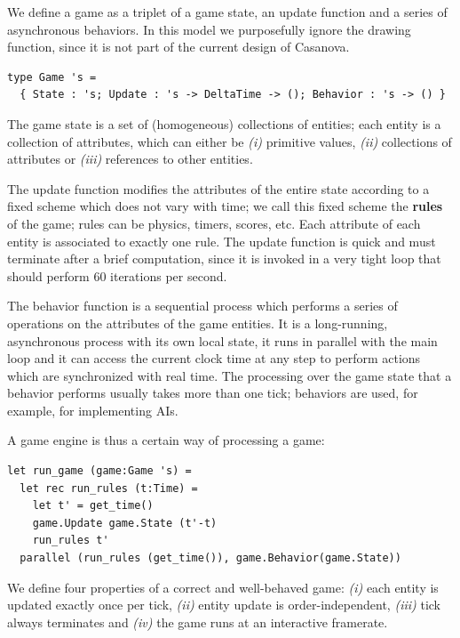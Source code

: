 
We define a game as a triplet of a game state, an update function and a series of asynchronous behaviors. In this model we purposefully ignore the drawing function, since it is not part of the current design of Casanova.

\begin{lstlisting}
type Game 's =  
  { State : 's; Update : 's -> DeltaTime -> (); Behavior : 's -> () }
\end{lstlisting}

The game state is a set of (homogeneous) collections of entities; each entity is a collection of attributes, which can either be \textit{(i)} primitive values, \textit{(ii)} collections of attributes or \textit{(iii)} references to other entities.

The update function modifies the attributes of the entire state according to a fixed scheme which does not vary with time; we call this fixed scheme the \textbf{rules} of the game; rules can be physics, timers, scores, etc. Each attribute of each entity is associated to exactly one rule. The update function is quick and must terminate after a brief computation, since it is invoked in a very tight loop that should perform 60 iterations per second.

The behavior function is a sequential process which performs a series of operations on the attributes of the game entities. It is a long-running, asynchronous process with its own local state, it runs in parallel with the main loop and it can access the current clock time at any step to perform actions which are synchronized with real time. The processing over the game state that a behavior performs usually takes more than one tick; behaviors are used, for example, for implementing AIs.

A game engine is thus a certain way of processing a game:

\begin{lstlisting}
let run_game (game:Game 's) =
  let rec run_rules (t:Time) =
    let t' = get_time()
    game.Update game.State (t'-t)
    run_rules t'
  parallel (run_rules (get_time()), game.Behavior(game.State))
\end{lstlisting}


We define four properties of a correct and well-behaved game: \textit{(i)} each entity is updated exactly once per tick, \textit{(ii)} entity update is order-independent, \textit{(iii)} tick always terminates and \textit{(iv)} the game runs at an interactive framerate.

